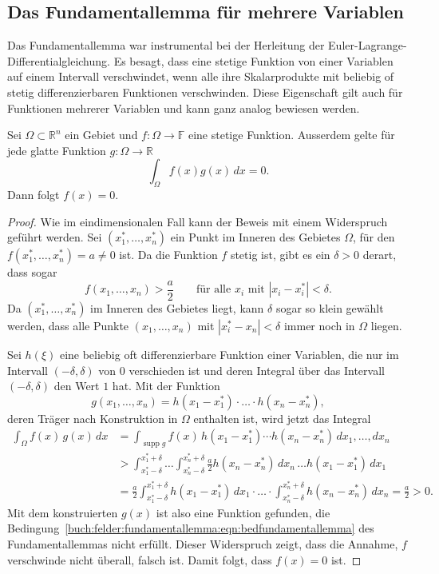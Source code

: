\subsection{Das Fundamentallemma für mehrere Variablen}
Das Fundamentallemma war instrumental bei der Herleitung der
Euler-Lagrange-Differentialgleichung.
Es besagt, dass eine stetige Funktion von einer Variablen auf einem Intervall
verschwindet, wenn alle ihre Skalarprodukte mit beliebig of stetig
differenzierbaren Funktionen verschwinden.
Diese Eigenschaft gilt auch für Funktionen mehrerer Variablen und kann
ganz analog bewiesen werden.

\begin{satz}[Fundamentallemma]
Sei $\Omega\subset\mathbb{R}^n$ ein Gebiet und $f\colon \Omega\to\mathbb{F}$
eine stetige Funktion.
Ausserdem gelte für jede glatte Funktion $g\colon\Omega\to\mathbb{R}$ 
\begin{equation}
\int_{\Omega} f(x)g(x)\,dx = 0.
\label{buch:felder:fundamentallemma:eqn:bedfundamentallemma}
\end{equation}
Dann folgt $f(x)=0$.
\end{satz}

\begin{proof}
Wie im eindimensionalen Fall kann der Beweis mit einem Widerspruch
geführt werden.
Sei $(x^*_1,\dots,x^*_n)$ ein Punkt im Inneren des Gebietes $\Omega$,
für den $f(x^*_1,\dots,x^*_n)=a\ne 0$ ist.
Da die Funktion $f$ stetig ist, gibt es ein $\delta>0$ derart,
dass sogar
\[
f(x_1,\dots,x_n) > \frac{a}2
\qquad\text{für alle $x_i$ mit $|x_i-x^*_i|<\delta$.}
\]
Da $(x^*_1,\dots,x^*_n)$ im Inneren des Gebietes liegt, kann 
$\delta$ sogar so klein gewählt werden, dass alle Punkte
$(x_1,\dots,x_n)$ mit $|x^*_i-x_n|<\delta$ immer noch in
$\Omega$ liegen.

Sei $h(\xi)$ eine beliebig oft differenzierbare Funktion einer Variablen,
die nur im Intervall $(-\delta,\delta)$ von $0$ verschieden ist und
deren Integral über das Intervall $(-\delta,\delta)$ den Wert $1$ hat.
Mit der Funktion
\[
g(x_1,\dots,x_n)
=
h(x_1-x^*_1)\cdot\ldots\cdot h(x_n-x^*_n),
\]
deren Träger nach Konstruktion in $\Omega$ enthalten ist, wird jetzt das
Integral
\begin{align*}
\int_{\Omega} f(x)\,g(x)\,dx
&=
\int_{\operatorname{supp} g}
f(x)\,h(x_1-x^*_1)\cdots h(x_n-x^*_n)
\,dx_1,\dots,dx_n
\\
&>
\int_{x^*_1-\delta}^{x^*_1+\delta}
\dots
\int_{x^*_n-\delta}^{x^*_n+\delta}
\frac{a}{2}
h(x_n-x^*_n) \,dx_n
\,\dots
h(x_1-x^*_1) \,dx_1
\\
&=
\frac{a}2
\int_{x^*_1-\delta}^{x^*_1+\delta}
h(x_1-x^*_1) \,dx_1
\cdot
\ldots
\cdot
\int_{x^*_n-\delta}^{x^*_n+\delta}
h(x_n-x^*_n) \,dx_n
=
\frac{a}2>0.
\end{align*}
Mit dem konstruierten $g(x)$ ist also eine Funktion gefunden, die
Bedingung~\eqref{buch:felder:fundamentallemma:eqn:bedfundamentallemma}
des Fundamentallemmas nicht erfüllt.
Dieser Widerspruch zeigt, dass die Annahme, $f$ verschwinde nicht überall,
falsch ist.
Damit folgt, dass $f(x)=0$ ist.
\end{proof}




